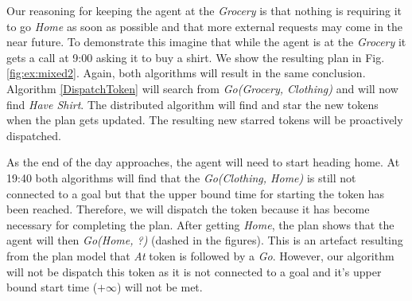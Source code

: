 Our reasoning for keeping the agent at the {\em Grocery} is that
nothing is requiring it to go {\em Home} as soon as possible and that
more external requests may come in the near future. To demonstrate
this imagine that while the agent is at the {\em Grocery} it gets a
call at 9:00 asking it to buy a shirt.  We show the resulting plan in
Fig. \ref{fig:ex:mixed2}. Again, both algorithms will result in the
same conclusion. Algorithm \ref{DispatchToken} will search from {\em
Go(Grocery, Clothing)} and will now find {\em Have Shirt}. The
distributed algorithm will find and star the new tokens when the plan
gets updated. The resulting new starred tokens will be proactively
dispatched.

As the end of the day approaches, the agent will need to start heading
home. At 19:40 both algorithms will find that the {\em Go(Clothing,
Home)} is still not connected to a goal but that the upper bound time
for starting the token has been reached. Therefore, we will dispatch
the token because it has become necessary for completing the plan.
After getting {\em Home}, the plan shows that the agent will then {\em
Go(Home, ?)} (dashed in the figures). This is an artefact resulting
from the plan model that {\em At} token is followed by a {\em Go}. 
However, our algorithm will not be dispatch this token as 
it is not connected to a goal and it's upper bound start time
($+\infty$) will not be met.



